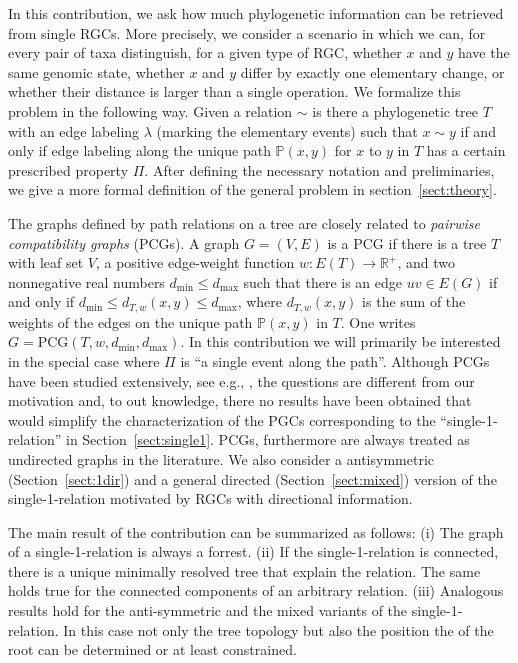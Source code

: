 \documentclass[smallextended]{svjour3}
\newcommand{\rev}[1]{\begingroup\color{blue}#1\endgroup}
\begin{document}
In this contribution, we ask how much phylogenetic information can be
retrieved from single RGCs. More precisely, we consider a scenario in which
we can, for every pair of taxa distinguish, for a given type of RGC,
whether $x$ and $y$ have the same genomic state, whether $x$ and $y$ differ
by exactly one elementary change, or whether their distance is larger than
a single operation. We formalize this problem in the following way. Given a
relation $\sim$ is there a phylogenetic tree $T$ with an edge labeling
$\lambda$ (marking the elementary events) such that $x\sim y$ if and only
if edge labeling along the unique path $\mathbb{P}(x,y)$ for $x$ to $y$ in
$T$ has a certain prescribed property $\Pi$. After defining the necessary
notation and preliminaries, we give a more formal definition of the general
problem in section~\ref{sect:theory}.

\rev{The graphs defined by path relations on a tree are closely related to
  \emph{pairwise compatibility graphs} (PCGs). A graph $G =(V,E)$ is a PCG
  if there is a tree $T$ with leaf set $V$, a positive edge-weight function
  $w:E(T)\to \mathbb{R}^+$, and two nonnegative real numbers $d_{\min}\le
  d_{\max}$ such that there is an edge $uv \in E(G)$ if and only if
  $d_{\min}\leq d_{T,w}(x,y) \leq d_{\max}$, where $d_{T,w}(x,y)$ is the
  sum of the weights of the edges on the unique path $\mathbb{P}(x,y)$ in
  $T$. One writes $G = \mathrm{PCG}(T, w, d_{\min} , d_{\max})$.} In this
contribution we will primarily be interested in the special case where
$\Pi$ is ``a single event along the path''. \rev{Although PCGs have been
  studied extensively, see e.g.,
  \citet{PCGsurvey,YHTR:08,YBR:10,CMPS:13,MR:13,DMR:13}, the questions are
  different from our motivation and, to out knowledge, there no results
  have been obtained that would simplify the characterization of the PGCs
  corresponding to the ``single-1-relation'' in Section~\ref{sect:single1}.
  PCGs, furthermore are always treated as undirected graphs in the
  literature.  We also consider a antisymmetric (Section~\ref{sect:1dir})
  and a general directed (Section~\ref{sect:mixed}) version of the
  single-1-relation motivated by RGCs with directional information.}

\rev{The main result of the contribution can be summarized as follows: (i)
  The graph of a single-1-relation is always a forrest. (ii) If the
  single-1-relation is connected, there is a unique minimally resolved tree
  that explain the relation. The same holds true for the connected
  components of an arbitrary relation. (iii) Analogous results hold for the
  anti-symmetric and the mixed variants of the single-1-relation. In this
  case not only the tree topology but also the position the of the root can
  be determined or at least constrained.}
\end{document}
